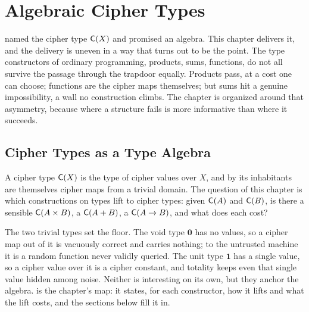 
\chapter{Algebraic Cipher Types}
\label{ch:algebraic-types}

 named the cipher type $\mathsf{C}(X)$ and promised an
algebra. This chapter delivers it, and the delivery is uneven in a way that
turns out to be the point. The type constructors of ordinary programming,
products, sums, functions, do not all survive the passage through the
trapdoor equally. Products pass, at a cost one can choose; functions are the
cipher maps themselves; but sums hit a genuine impossibility, a wall no
construction climbs. The chapter is organized around that asymmetry, because
where a structure fails is more informative than where it succeeds.

\section{Cipher Types as a Type Algebra}
\label{sec:type-algebra}

A cipher type $\mathsf{C}(X)$ is the type of cipher values over $X$, and by
 its inhabitants are themselves cipher maps from a
trivial domain. The question of this chapter is which constructions on
types lift to cipher types: given $\mathsf{C}(A)$ and $\mathsf{C}(B)$, is there a
sensible $\mathsf{C}(A \times B)$, a $\mathsf{C}(A + B)$, a $\mathsf{C}(A \to B)$, and
what does each cost?

The two trivial types set the floor. The void type $\mathbf{0}$ has no
values, so a cipher map out of it is vacuously correct and carries nothing;
to the untrusted machine it is a random function never validly queried. The
unit type $\mathbf{1}$ has a single value, so a cipher value over it is a
cipher constant, and totality keeps even that single value hidden among
noise. Neither is interesting on its own, but they anchor the algebra.
 is the chapter's map: it states, for each
constructor, how it lifts and what the lift costs, and the sections below
fill it in.

